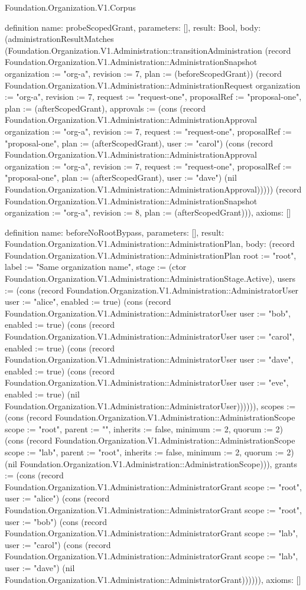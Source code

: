 \begin{lexlean}{Foundation.Organization.V1.Corpus}
\begin{semanticmodule}
definition{
  name: probeScopedGrant,
  parameters: [],
  result: Bool,
  body: (administrationResultMatches (Foundation.Organization.V1.Administration::transitionAdministration (record Foundation.Organization.V1.Administration::AdministrationSnapshot {organization := "org-a", revision := 7, plan := (beforeScopedGrant)}) (record Foundation.Organization.V1.Administration::AdministrationRequest {organization := "org-a", revision := 7, request := "request-one", proposalRef := "proposal-one", plan := (afterScopedGrant), approvals := (cons (record Foundation.Organization.V1.Administration::AdministrationApproval {organization := "org-a", revision := 7, request := "request-one", proposalRef := "proposal-one", plan := (afterScopedGrant), user := "carol"}) (cons (record Foundation.Organization.V1.Administration::AdministrationApproval {organization := "org-a", revision := 7, request := "request-one", proposalRef := "proposal-one", plan := (afterScopedGrant), user := "dave"}) (nil Foundation.Organization.V1.Administration::AdministrationApproval)))})) (record Foundation.Organization.V1.Administration::AdministrationSnapshot {organization := "org-a", revision := 8, plan := (afterScopedGrant)})),
  axioms: []
}

definition{
  name: beforeNoRootBypass,
  parameters: [],
  result: Foundation.Organization.V1.Administration::AdministrationPlan,
  body: (record Foundation.Organization.V1.Administration::AdministrationPlan {root := "root", label := "Same organization name", stage := (ctor Foundation.Organization.V1.Administration::AdministrationStage.Active), users := (cons (record Foundation.Organization.V1.Administration::AdministratorUser {user := "alice", enabled := true}) (cons (record Foundation.Organization.V1.Administration::AdministratorUser {user := "bob", enabled := true}) (cons (record Foundation.Organization.V1.Administration::AdministratorUser {user := "carol", enabled := true}) (cons (record Foundation.Organization.V1.Administration::AdministratorUser {user := "dave", enabled := true}) (cons (record Foundation.Organization.V1.Administration::AdministratorUser {user := "eve", enabled := true}) (nil Foundation.Organization.V1.Administration::AdministratorUser)))))), scopes := (cons (record Foundation.Organization.V1.Administration::AdministrationScope {scope := "root", parent := "", inherits := false, minimum := 2, quorum := 2}) (cons (record Foundation.Organization.V1.Administration::AdministrationScope {scope := "lab", parent := "root", inherits := false, minimum := 2, quorum := 2}) (nil Foundation.Organization.V1.Administration::AdministrationScope))), grants := (cons (record Foundation.Organization.V1.Administration::AdministratorGrant {scope := "root", user := "alice"}) (cons (record Foundation.Organization.V1.Administration::AdministratorGrant {scope := "root", user := "bob"}) (cons (record Foundation.Organization.V1.Administration::AdministratorGrant {scope := "lab", user := "carol"}) (cons (record Foundation.Organization.V1.Administration::AdministratorGrant {scope := "lab", user := "dave"}) (nil Foundation.Organization.V1.Administration::AdministratorGrant)))))}),
  axioms: []
}


\end{semanticmodule}
\end{lexlean}
